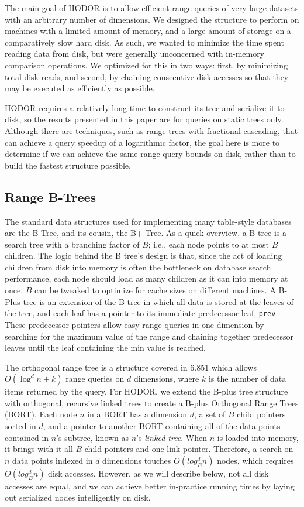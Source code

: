 \documentclass[11pt, oneside]{article}
\newcommand{\ms}{\texttt}
\begin{document}
The main goal of HODOR is to allow efficient range queries of very large
datasets with an arbitrary number of dimensions. We designed the structure to
perform on machines with a limited amount of memory, and a large amount of
storage on a comparatively slow hard disk. As such, we wanted to minimize the
time spent reading data from disk, but were generally unconcerned with
in-memory comparison operations. We optimized for this in two ways: first, by
minimizing total disk reads, and second, by chaining consecutive disk accesses
so that they may be executed as efficiently as possible. 

HODOR requires a relatively long time to construct its tree and serialize it to
disk, so the results presented in this paper are for queries on static trees
only. Although there are techniques, such as range trees with fractional cascading,
that can achieve a query speedup of a logarithmic factor, the goal here is more
to determine if we can achieve the same range query bounds on disk, rather than
to build the fastest structure possible.

\subsection{Range B-Trees}

The standard data structures used for implementing many table-style databases
are the B Tree, and its cousin, the B+ Tree. As a quick overview, a B tree is a
search tree with a branching factor of $B$; i.e., each node points to at most
$B$ children. The logic behind the B tree's design is that, since the act of
loading children from disk into memory is often the bottleneck on database
search performance, each node should load as many children as it can into memory
at once. $B$ can be tweaked to optimize for cache sizes on different machines.
A B-Plus tree is an extension of the B tree in which all data is stored at the
leaves of the tree, and each leaf has a pointer to its immediate predecessor
leaf, \ms{prev}. These predecessor pointers allow easy range queries in one
dimension by searching for the maximum value of the range and chaining together
predecessor leaves until the leaf containing the min value is reached.

The orthogonal range tree is a structure covered in 6.851 which allows $O(\log^d
n + k)$ range queries on $d$ dimensions, where $k$ is the number of data items
returned by the query. For HODOR, we extend the B-plus tree structure with
orthogonal, recursive linked trees to create a B-plus Orthogonal Range Trees
(BORT). Each node $n$ in a BORT has a dimension $d$, a set of $B$ child pointers
sorted in $d$, and a pointer to another BORT containing all of the data points
contained in $n$'s subtree, known as $n$'s \textit{linked tree}.  When $n$ is
loaded into memory, it brings with it all $B$ child pointers and one link
pointer.  Therefore, a search on $n$ data points indexed in $d$ dimensions
touches $O(log^d_B n)$ nodes, which requires $O(log^d_B n)$ disk accesses.
However, as we will describe below, not all disk accesses are equal, and we can
achieve better in-practice running times by laying out serialized nodes
intelligently on disk.
\end{document}
